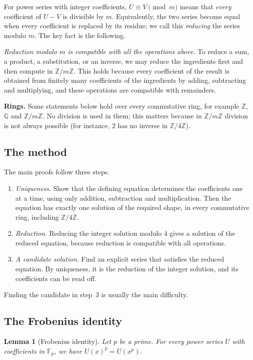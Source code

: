 \documentclass[11pt,a4paper]{article}
\newtheorem{lemma}[theorem]{Lemma}
\theoremstyle{definition}
\theoremstyle{remark}
\newcommand{\Z}{\mathbb{Z}}
\newcommand{\Q}{\mathbb{Q}}
\newcommand{\F}{\mathbb{F}}
\newcommand{\para}[1]{\par\medskip\noindent\textbf{#1}\enspace}
\begin{document}
For power series with integer coefficients, $U\equiv V\pmod m$ means that \emph{every} coefficient of $U-V$ is
divisible by $m$. Equivalently, the two series become equal when every coefficient is replaced by its residue; we call
this \emph{reducing} the series modulo $m$. The key fact is the following.

\emph{Reduction modulo $m$ is compatible with all the operations above.} To reduce a sum, a product, a substitution, or
an inverse, we may reduce the ingredients first and then compute in $\Z/m\Z$. This holds because every
coefficient of the result is obtained from finitely many coefficients of the ingredients by adding, subtracting and
multiplying, and these operations are compatible with remainders.

\para{Rings.} Some statements below hold over every commutative ring, for example $\Z$, $\Q$ and $\Z/m\Z$. No
division is used in them; this matters because in $\Z/m\Z$ division is not always possible (for instance, $2$ has no inverse in
$\Z/4\Z$).

\subsection{The method}
The main proofs follow three steps.
\begin{enumerate}
\item \emph{Uniqueness.} Show that the defining equation determines the coefficients one at a time, using only
addition, subtraction and multiplication. Then the equation has exactly one solution of the required shape, in every
commutative ring, including $\Z/4\Z$.
\item \emph{Reduction.} Reducing the integer solution modulo $4$ gives a solution of the reduced equation,
because reduction is compatible with all operations.
\item \emph{A candidate solution.} Find an explicit series that satisfies the reduced equation. By uniqueness, it is
the reduction of the integer solution, and its coefficients can be read off.
\end{enumerate}
Finding the candidate in step~3 is usually the main difficulty.
\subsection{The Frobenius identity}
\begin{lemma}[Frobenius identity]\label{lem:frobenius}
Let $p$ be a prime. For every power series $U$ with coefficients in $\F_p$, we have $U(x)^p=U(x^p)$.
\end{lemma}
\end{document}
